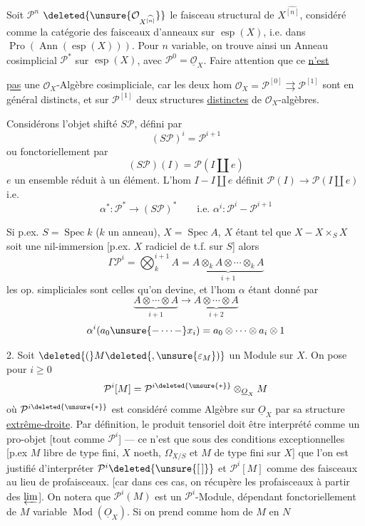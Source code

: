 Soit $\mathcal P^n$
$\deleted{\unsure{\mathcal O_{X^{\widehat{[n]}}}}}$
le faisceau structural de $X^{\widehat{[n]}}$,
 considéré comme
la catégorie des faisceaux d'anneaux sur $\operatorname{esp}(X)$,
i.e. dans $\operatorname{Pro}(\operatorname{Ann}(\operatorname{esp}(X)))$.
Pour $n$ variable, on trouve ainsi un Anneau cosimplicial
$\mathcal P^*$ sur $\operatorname{esp}(X)$, avec
$\mathcal P^0=\underline{\mathcal O}_X$.
Faire attention que ce \uline{n'est}

\uline{pas} une $\mathcal O_X$-Algèbre cosimpliciale, car les deux hom
$\mathcal O_X=\mathcal P^{[0]}\rightrightarrows\mathcal P^{[1]}$
sont en général distincts, et  sur $\mathcal P^{[1]}$
deux structures \uline{distinctes} de $\mathcal O_X$-algèbres.

Considérons l'objet shifté $S\mathcal P$, défini par
\[
(S\mathcal P)^i=\mathcal P^{i+1}
\]
ou fonctoriellement par
\[
(S\mathcal P)(I)=\mathcal P(I\amalg e)
\]
$e$ un ensemble réduit à un élément.
L'hom  $I-I\amalg e$ définit
$\mathcal P(I)\longrightarrow\mathcal P(I\amalg e)$ i.e.
\[
\alpha^*:\mathcal P^*\longrightarrow(S\mathcal P)^*
\qquad\text{i.e. }\alpha^i:\mathcal P^i-\mathcal P^{i+1}
\]

Si p.ex. $S=\operatorname{Spec}k$ ($k$ un anneau),
$X=\operatorname{Spec}A$, $X$ étant tel que $X-X\times_SX$
soit une nil-immersion [p.ex. $X$ radiciel de t.f. sur $S$]
alors 
\[
\Gamma\mathcal P^i=\bigotimes_k^{i+1}A
=\underbrace{A\otimes_k A\otimes\cdots\otimes_k A}_{i+1}
\]
les op. simpliciales sont celles qu'on devine, et l'hom $\alpha$
étant donné par
\[
\underbrace{A\otimes\cdots\otimes A}_{i+1}
\longrightarrow\underbrace{A\otimes\cdots\otimes A}_{i+2}
\]
\[
\alpha^i(a_0\unsure{-\cdots-}x_i)
=a_0\otimes\cdots\otimes a_i\otimes1
\]

2. Soit $\deleted{(}M\deleted{,\unsure{\varepsilon_M})}$ un Module sur $X$.   On pose pour $i\geq0$
\[
\mathcal P^i[M]=\mathcal P^{i\deleted{\unsure{*}}}\otimes_{\underline O_X}M
\]
où $\mathcal P^{i\deleted{\unsure{*}}}$ est considéré comme Algèbre sur $\underline O_X$ par sa structure \uline{extrême-droite}.  Par définition, le produit tensoriel doit être interprété comme un pro-objet [tout comme $\mathcal P^i$] --- ce n'est que sous des conditions exceptionnelles [p.ex $M$ libre de type fini, $X$  noeth,  $\Omega_{X/S}$  et $M$ de type fini sur $X$] que l'on est justifié d'interpréter $\mathcal P^i\deleted{\unsure{[\,]}}$ et $\mathcal P^i[M]$ comme des faisceaux au lieu de profaisceaux. [car dans ces cas, on récupère les profaisceaux à partir des  $\varprojlim$]. On notera que $\mathcal P^i(M)$ est un $\mathcal P^i$-Module, dépendant fonctoriellement de $M$ variable  $\operatorname{Mod}(\underline O_X)$.
Si on prend comme hom de $M$ en $N$

